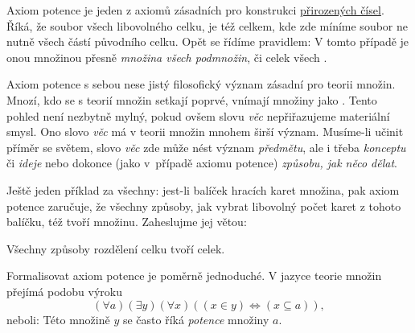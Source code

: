 Axiom potence je jeden z axiomů zásadních pro konstrukci
\hyperref[chap:prirozena-cisla]{přirozených čísel}. Říká, že soubor všech
 libovolného celku, je též celkem, kde  zde míníme soubor ne
nutně všech částí původního celku. Opět se řídíme pravidlem:  V tomto případě je onou množinou přesně \emph{množina
všech podmnožin}, či celek všech .

Axiom potence s sebou nese jistý filosofický význam zásadní pro teorii množin.
Mnozí, kdo se s teorií množin setkají poprvé, vnímají množiny jako . Tento pohled není nezbytně mylný, pokud ovšem slovu \emph{věc}
nepřiřazujeme materiální smysl. Ono slovo \emph{věc} má v teorii množin mnohem
širší význam. Musíme-li učinit příměr se světem, slovo \emph{věc} zde může nést
význam \emph{předmětu}, ale i třeba \emph{konceptu} či \emph{ideje} nebo dokonce
(jako v~případě axiomu potence) \emph{způsobu, jak něco dělat}.

Ještě jeden příklad za všechny: jest-li balíček hracích karet množina, pak axiom
potence zaručuje, že všechny způsoby, jak vybrat libovolný počet karet z tohoto
balíčku, též tvoří množinu. Zaheslujme jej větou:
\begin{highlightBox}
  \alert{Všechny způsoby rozdělení celku tvoří celek.}
\end{highlightBox}
Formalisovat axiom potence je poměrně jednoduché. V jazyce teorie množin přejímá
podobu výroku
\begin{equation}
  \label{eq:axiom-potence}
  ( \forall a)( \exists y)( \forall x)((x \in y) \Leftrightarrow (x \subseteq
  a)),
\end{equation}
neboli:  Této množině $y$ se často říká \emph{potence} množiny
$a$.

